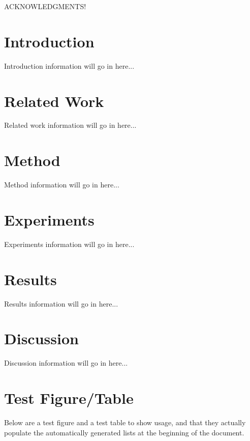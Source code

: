\documentclass[11pt,oneside,a4paper,onecolumn]{article}                 %
\begin{document}


ACKNOWLEDGMENTS!

\pagebreak[4]


\section{Introduction}
Introduction information will go in here...

\section{Related Work}
Related work information will go in here...

\section{Method}
Method information will go in here...
  
\section{Experiments}
Experiments information will go in here...
  
\section{Results}
Results information will go in here...
  
\section{Discussion}
Discussion information will go in here...\cite{yan2007determining}\\ %
\pagebreak[4]

\section{Test Figure/Table}
Below are a test figure and a test table to show usage, and that they actually populate the automatically generated lists at the beginning of the document.
\end{document}
